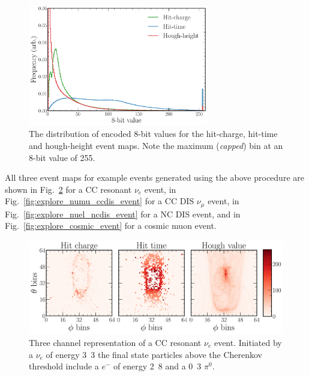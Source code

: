 \begin{figure} %
    \includegraphics[width=0.7\textwidth]{diagrams/6-cvn/chipsnet/explore_8_bit_range.pdf}
    \caption[Event map encoded 8-bit distributions.]
    {The distribution of encoded 8-bit values for the hit-charge, hit-time and hough-height event
        maps. Note the maximum (\emph{capped}) bin at an 8-bit value of 255.}
    \label{fig:explore_8_bit_range}
\end{figure}

All three event maps for example events generated using the above procedure are shown in
Fig.~\ref{fig:explore_nuel_ccres_event} for a CC resonant $\nu_{e}$ event, in
Fig.~\ref{fig:explore_numu_ccdis_event} for a CC DIS $\nu_{\mu}$ event, in
Fig.~\ref{fig:explore_nuel_ncdis_event} for a NC DIS event, and in
Fig.~\ref{fig:explore_cosmic_event} for a cosmic muon event.

\begin{figure} %
    \includegraphics[width=\textwidth]{diagrams/6-cvn/chipsnet/explore_nuel_ccres_event.pdf}
    \caption[Example of a CC resonant $\nu_{e}$ event.]
    {Three channel representation of a CC resonant $\nu_{e}$ event. Initiated by a $\nu_{e}$ of
        energy \unit{3.3}{\GeV} the final state particles above the Cherenkov threshold include a
        $e^{-}$ of energy \unit{2.8}{\GeV} and a \unit{0.3}{\GeV} $\pi^{0}$.}
    \label{fig:explore_nuel_ccres_event}
\end{figure}

